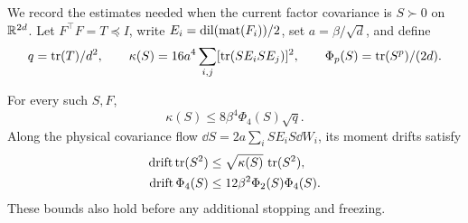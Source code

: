 We record the estimates needed when the current factor covariance is $S\succ0$ on $\mathbb R^{2d}$. Let $F^\top F=T\preceq I$, write
$E_i=\operatorname{dil}(\operatorname{mat}(F_i))/2$, set $a=\beta/\sqrt d$, and define
\[
 q=\operatorname{tr}(T)/d^2,\qquad
 \kappa(S)=16a^4\sum_{i,j}[\operatorname{tr}(SE_iSE_j)]^2,
 \qquad \Phi_p(S)=\operatorname{tr}(S^p)/(2d).
\]

\begin{lemma}
\label{lem:physical-moments}
For every such $S,F$,
\begin{equation}
 \kappa(S)\le8\beta^4\Phi_4(S)\sqrt q.
 \label{eq:weighted-gram}
\end{equation}
Along the physical covariance flow
$\dd S=2a\sum_iSE_iS\dd W_i$, its moment drifts satisfy
\begin{align}
 \operatorname{drift}\operatorname{tr}(S^2)
   &\le\sqrt{\kappa(S)}\,\operatorname{tr}(S^2),\label{eq:physical-second}\\
 \operatorname{drift}\Phi_4(S)
   &\le12\beta^2\Phi_2(S)\Phi_4(S).
 \label{eq:physical-fourth}
\end{align}
These bounds also hold before any additional stopping and freezing.
\end{lemma}

